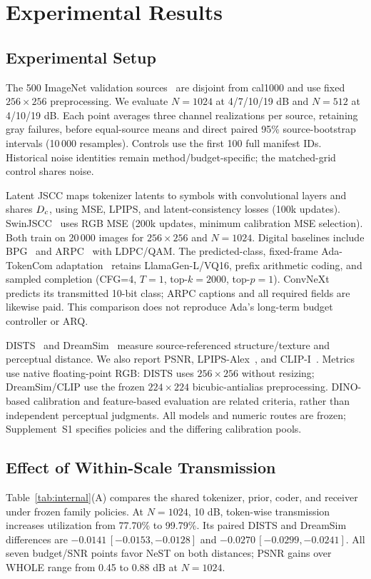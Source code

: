 \section{Experimental Results}
\ifCLASSOPTIONonecolumn\fi
\subsection{Experimental Setup}
The 500 ImageNet validation sources~\cite{imagenet} are disjoint from cal1000 and use fixed $256\times256$ preprocessing. We evaluate $N=1024$ at 4/7/10/19 dB and $N=512$ at 4/10/19 dB. Each point averages three channel realizations per source, retaining gray failures, before equal-source means and direct paired 95\% source-bootstrap intervals (10\,000 resamples). Controls use the first 100 full manifest IDs. Historical noise identities remain method/budget-specific; the matched-grid control shares noise.

Latent JSCC maps tokenizer latents to symbols with convolutional layers and shares $D_c$, using MSE, LPIPS, and latent-consistency losses (100k updates). SwinJSCC~\cite{swinjscc} uses RGB MSE (200k updates, minimum calibration MSE selection). Both train on 20\,000 images for $256\times256$ and $N=1024$. Digital baselines include BPG~\cite{bpg} and ARPC~\cite{arpc} with LDPC/QAM. The predicted-class, fixed-frame Ada-TokenCom adaptation~\cite{adatokencom} retains LlamaGen-L/VQ16, prefix arithmetic coding, and sampled completion (CFG=4, $T=1$, top-$k=2000$, top-$p=1$). ConvNeXt predicts its transmitted 10-bit class; ARPC captions and all required fields are likewise paid. This comparison does not reproduce Ada's long-term budget controller or ARQ.

DISTS~\cite{dists} and DreamSim~\cite{dreamsim} measure source-referenced structure/texture and perceptual distance. We also report PSNR, LPIPS-Alex~\cite{lpips}, and CLIP-I~\cite{clip}. Metrics use native floating-point RGB: DISTS uses $256\times256$ without resizing; DreamSim/CLIP use the frozen $224\times224$ bicubic-antialias preprocessing. DINO-based calibration and feature-based evaluation are related criteria, rather than independent perceptual judgments. All models and numeric routes are frozen; Supplement~S1 specifies policies and the differing calibration pools.

\ifCLASSOPTIONonecolumn\else\fi
\subsection{Effect of Within-Scale Transmission}

Table~\ref{tab:internal}(A) compares the shared tokenizer, prior, coder, and receiver under frozen family policies. At $N=1024$, 10 dB, token-wise transmission increases utilization from 77.70\% to 99.79\%. Its paired DISTS and DreamSim differences are $-0.0141\,[-0.0153,-0.0128]$ and $-0.0270\,[-0.0299,-0.0241]$. All seven budget/SNR points favor NeST on both distances; PSNR gains over WHOLE range from 0.45 to 0.88 dB at $N=1024$.

